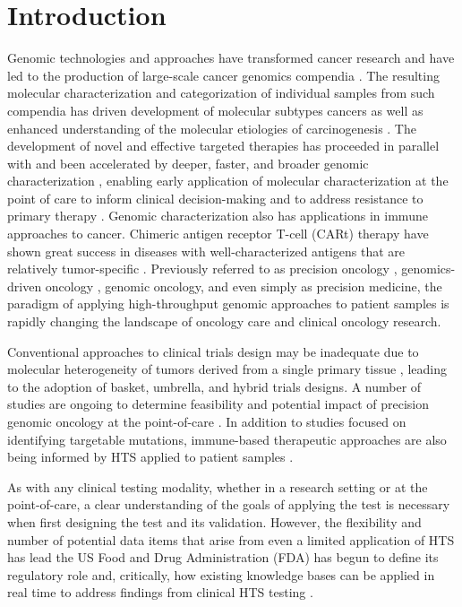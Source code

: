 \documentclass{article}
\begin{document}
\section{Introduction}
Genomic technologies and approaches have transformed
cancer research and have led to the production of large-scale cancer
genomics compendia
\cite{noauthor_undated-vx,Cancer_Genome_Atlas_Research_Network2013-gt}. The
resulting molecular characterization and categorization of individual
samples from such compendia has driven development of molecular
subtypes cancers as well as enhanced understanding of the molecular
etiologies of carcinogenesis
\cite{Cancer_Genome_Atlas_Network2012-nz,Cancer_Genome_Atlas_Research_Network2015-gd,noauthor_2008-wg}. The
development of novel and effective targeted therapies has proceeded in
parallel with and been accelerated by deeper, faster, and broader
genomic characterization \cite{Blumenthal2016-fb}, enabling early
application of molecular characterization at the point of care to
inform clinical decision-making
\cite{Flaherty2012-dq,Shaw2013-wl,Maemondo2010-dj,Druker2006-qk} and
to address resistance to primary therapy \cite{Ai2014-nf}. Genomic
characterization also has applications in immune approaches to
cancer. Chimeric antigen receptor T-cell (CARt) therapy have shown
great success in diseases with well-characterized antigens that are
relatively tumor-specific \cite{Grupp2013-nd}. Previously referred to
as precision oncology \cite{Sohal2015-bi}, genomics-driven oncology
\cite{Garraway2013-zo}, genomic oncology, and even simply as precision
medicine, the paradigm of applying high-throughput genomic approaches
to patient samples is rapidly changing the landscape of oncology care
and clinical oncology research.

Conventional approaches to clinical trials design may be inadequate
due to molecular heterogeneity of tumors derived from a single primary
tissue \cite{Simon2016-ik}, leading to the adoption of basket,
umbrella, and hybrid trials designs. A number of studies are ongoing
to determine feasibility and potential impact of precision genomic
oncology at the point-of-care
\cite{Cheng2015-wh,noauthor_undated-da,Lopez-Chavez2015-cg}. In
addition to studies focused on identifying targetable mutations,
immune-based therapeutic approaches are also being informed by HTS
applied to patient samples
\cite{Bethune2017-ns,Chalmers2017-ya,Faltas2016-yz}.

As with any clinical testing modality, whether in a research setting
or at the point-of-care, a clear understanding of the goals of
applying the test is necessary when first designing the test and its
validation. However, the flexibility and number of potential data
items that arise from even a limited application of HTS has lead the
US Food and Drug Administration (FDA) has begun to define its
regulatory role \cite{Fda2015-kv} and, critically, how existing
knowledge bases can be applied in real time to address findings from
clinical HTS testing \cite{Fda2016-kx}.
\end{document}
